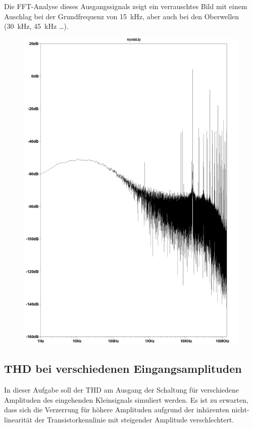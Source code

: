 Die FFT-Analyse dieses Ausgangssignals zeigt ein verrauschtes Bild mit einem Auschlag bei der Grundfrequenz von \SI{15}{\kilo \hertz}, aber auch bei den Oberwellen (\SI{30}{\kilo \hertz}, \SI{45}{\kilo \hertz} \ldots).

\begin{figure}[H]
    \centering
    \includegraphics[width = \textwidth]{tex/1_Microphone/pictures/fft_output.png}
    \label{fig:my_label}
\end{figure}

\subsection{THD bei verschiedenen Eingangsamplituden}

In dieser Aufgabe soll der THD am Ausgang der Schaltung für verschiedene Amplituden des eingehenden Kleinsignals simuliert werden. Es ist zu erwarten, dass sich die Verzerrung für höhere Amplituden aufgrund der inhärenten nicht-linearität der Transistorkennlinie mit steigender Amplitude verschlechtert.

